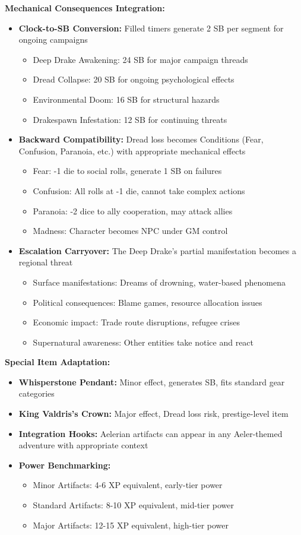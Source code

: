 \documentclass[11pt]{article}
\begin{document}
\textbf{Mechanical Consequences Integration:} \begin{itemize} \item \textbf{Clock-to-SB Conversion:} Filled timers generate 2 SB per segment for ongoing campaigns \begin{itemize} \item Deep Drake Awakening: 24 SB for major campaign threads \item Dread Collapse: 20 SB for ongoing psychological effects \item Environmental Doom: 16 SB for structural hazards \item Drakespawn Infestation: 12 SB for continuing threats \end{itemize} \item \textbf{Backward Compatibility:} Dread loss becomes Conditions (Fear, Confusion, Paranoia, etc.) with appropriate mechanical effects \begin{itemize} \item Fear: -1 die to social rolls, generate 1 SB on failures \item Confusion: All rolls at -1 die, cannot take complex actions \item Paranoia: -2 dice to ally cooperation, may attack allies \item Madness: Character becomes NPC under GM control \end{itemize} \item \textbf{Escalation Carryover:} The Deep Drake's partial manifestation becomes a regional threat \begin{itemize} \item Surface manifestations: Dreams of drowning, water-based phenomena \item Political consequences: Blame games, resource allocation issues \item Economic impact: Trade route disruptions, refugee crises \item Supernatural awareness: Other entities take notice and react \end{itemize} \end{itemize}

\textbf{Special Item Adaptation:} \begin{itemize} \item \textbf{Whisperstone Pendant:} Minor effect, generates SB, fits standard gear categories \item \textbf{King Valdris's Crown:} Major effect, Dread loss risk, prestige-level item \item \textbf{Integration Hooks:} Aelerian artifacts can appear in any Aeler-themed adventure with appropriate context \item \textbf{Power Benchmarking:} \begin{itemize} \item Minor Artifacts: 4-6 XP equivalent, early-tier power \item Standard Artifacts: 8-10 XP equivalent, mid-tier power \item Major Artifacts: 12-15 XP equivalent, high-tier power \end{itemize} \end{itemize}
\end{document}
